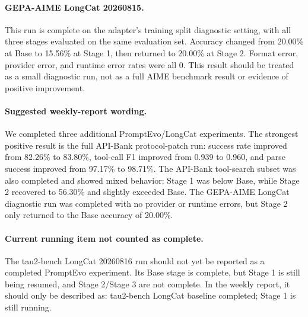 \documentclass[11pt]{article}
\begin{document}
\paragraph{GEPA-AIME LongCat 20260815.}
This run is complete on the adapter's training split diagnostic setting, with
all three stages evaluated on the same evaluation set. Accuracy changed from
20.00\% at Base to 15.56\% at Stage 1, then returned to 20.00\% at Stage 2.
Format error, provider error, and runtime error rates were all 0. This result
should be treated as a small diagnostic run, not as a full AIME benchmark result
or evidence of positive improvement.

\paragraph{Suggested weekly-report wording.}
We completed three additional PromptEvo/LongCat experiments. The strongest
positive result is the full API-Bank protocol-patch run: success rate improved
from 82.26\% to 83.80\%, tool-call F1 improved from 0.939 to 0.960,
and parse success improved from 97.17\% to 98.71\%. The API-Bank tool-search
subset was also completed and showed mixed behavior: Stage 1 was below Base,
while Stage 2 recovered to 56.30\% and slightly exceeded Base. The GEPA-AIME
LongCat diagnostic run was completed with no provider or runtime errors, but
Stage 2 only returned to the Base accuracy of 20.00\%.

\paragraph{Current running item not counted as complete.}
The tau2-bench LongCat 20260816 run should not yet be reported as a completed
PromptEvo experiment. Its Base stage is complete, but Stage 1 is still being
resumed, and Stage 2/Stage 3 are not complete. In the weekly report, it should
only be described as: tau2-bench LongCat baseline completed; Stage 1 is still
running.
\end{document}
